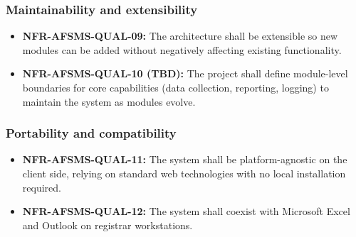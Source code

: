 \documentclass[11pt, a4paper]{article}
\begin{document}
\subsubsection{Maintainability and extensibility}
\begin{itemize}
    \item \textbf{NFR-AFSMS-QUAL-09:} The architecture shall be extensible so new modules can be added without negatively affecting existing functionality.
    \item \textbf{NFR-AFSMS-QUAL-10 (TBD):} The project shall define module-level boundaries for core capabilities (data collection, reporting, logging) to maintain the system as modules evolve.
\end{itemize}

\subsubsection{Portability and compatibility}
\begin{itemize}
    \item \textbf{NFR-AFSMS-QUAL-11:} The system shall be platform-agnostic on the client side, relying on standard web technologies with no local installation required.
    \item \textbf{NFR-AFSMS-QUAL-12:} The system shall coexist with Microsoft Excel and Outlook on registrar workstations.
\end{itemize}
\end{document}
